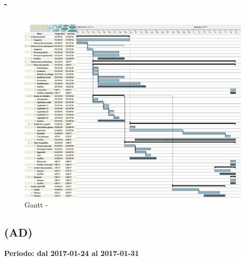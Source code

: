 \documentclass[./PianoDiProgetto.tex]{subfiles}
\begin{document}
  \subsubsection{ - \PerAR}
    \begin{figure}[!h]
    \centering
    \includegraphics[width=\textwidth]{images/AR}
    \caption{Gantt - \PerAR}
    \end{figure}
    
	\subsection{\PerAD{} (AD)}
  \textbf{Periodo: dal 2017-01-24 al 2017-01-31}
\end{document}
